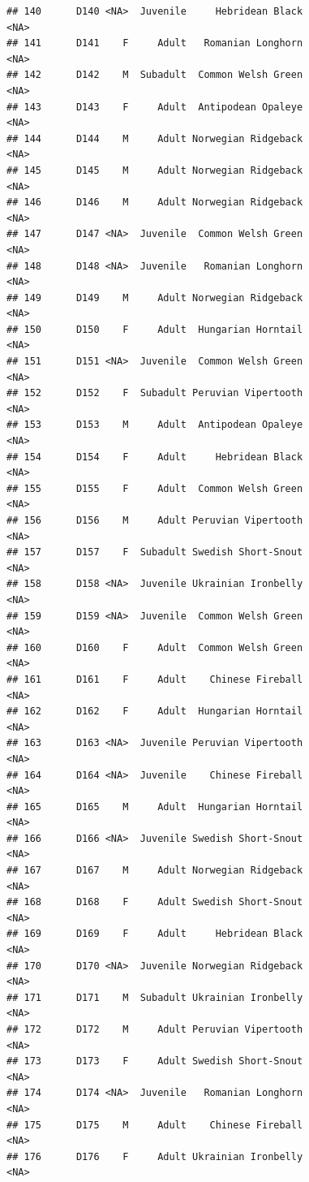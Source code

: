 \documentclass[
]{book}
\begin{document}
\begin{verbatim}
## 140      D140 <NA>  Juvenile     Hebridean Black                <NA>
## 141      D141    F     Adult   Romanian Longhorn                <NA>
## 142      D142    M  Subadult  Common Welsh Green                <NA>
## 143      D143    F     Adult  Antipodean Opaleye                <NA>
## 144      D144    M     Adult Norwegian Ridgeback                <NA>
## 145      D145    M     Adult Norwegian Ridgeback                <NA>
## 146      D146    M     Adult Norwegian Ridgeback                <NA>
## 147      D147 <NA>  Juvenile  Common Welsh Green                <NA>
## 148      D148 <NA>  Juvenile   Romanian Longhorn                <NA>
## 149      D149    M     Adult Norwegian Ridgeback                <NA>
## 150      D150    F     Adult  Hungarian Horntail                <NA>
## 151      D151 <NA>  Juvenile  Common Welsh Green                <NA>
## 152      D152    F  Subadult Peruvian Vipertooth                <NA>
## 153      D153    M     Adult  Antipodean Opaleye                <NA>
## 154      D154    F     Adult     Hebridean Black                <NA>
## 155      D155    F     Adult  Common Welsh Green                <NA>
## 156      D156    M     Adult Peruvian Vipertooth                <NA>
## 157      D157    F  Subadult Swedish Short-Snout                <NA>
## 158      D158 <NA>  Juvenile Ukrainian Ironbelly                <NA>
## 159      D159 <NA>  Juvenile  Common Welsh Green                <NA>
## 160      D160    F     Adult  Common Welsh Green                <NA>
## 161      D161    F     Adult    Chinese Fireball                <NA>
## 162      D162    F     Adult  Hungarian Horntail                <NA>
## 163      D163 <NA>  Juvenile Peruvian Vipertooth                <NA>
## 164      D164 <NA>  Juvenile    Chinese Fireball                <NA>
## 165      D165    M     Adult  Hungarian Horntail                <NA>
## 166      D166 <NA>  Juvenile Swedish Short-Snout                <NA>
## 167      D167    M     Adult Norwegian Ridgeback                <NA>
## 168      D168    F     Adult Swedish Short-Snout                <NA>
## 169      D169    F     Adult     Hebridean Black                <NA>
## 170      D170 <NA>  Juvenile Norwegian Ridgeback                <NA>
## 171      D171    M  Subadult Ukrainian Ironbelly                <NA>
## 172      D172    M     Adult Peruvian Vipertooth                <NA>
## 173      D173    F     Adult Swedish Short-Snout                <NA>
## 174      D174 <NA>  Juvenile   Romanian Longhorn                <NA>
## 175      D175    M     Adult    Chinese Fireball                <NA>
## 176      D176    F     Adult Ukrainian Ironbelly                <NA>

\end{verbatim}
\end{document}
